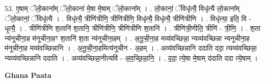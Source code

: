 \documentclass[17pt]{extarticle}
\begin{document}
53. ए॒षाम् ॅलो॒काना᳚म् ॅलो॒काना॑ मे॒षा मे॒षाम् ॅलो॒काना᳚म् । . लो॒कानां॒ ॅविधृ॑त्यै॒ विधृ॑त्यै लो॒काना᳚म् ॅलो॒कानां॒ ॅविधृ॑त्यै । . विधृ॑त्यै॒ त्रीणि॑त्रीणि॒ त्रीणि॑त्रीणि॒ विधृ॑त्यै॒ विधृ॑त्यै॒ त्रीणि॑त्रीणि । . विधृ॑त्या॒ इति॒ वि - धृ॒त्यै॒ । . त्रीणि॑त्रीणि श॒तानि॑ श॒तानि॒ त्रीणि॑त्रीणि॒ त्रीणि॑त्रीणि श॒तानि॑ । . त्रीणि॑त्री॒णीति॒ त्रीणि॑ - त्री॒णि॒ । . श॒ता न्य॑नूचीना॒ह म॑नूचीना॒हꣳ श॒तानि॑ श॒ता न्य॑नूचीना॒हम् । . अ॒नू॒ची॒ना॒ह मव्य॑वच्छिन्ना॒ न्यव्य॑वच्छिन्ना न्यनूचीना॒ह म॑नूचीना॒ह मव्य॑वच्छिन्नानि । . अ॒नू॒ची॒ना॒हमित्य॑नूचीन - अ॒हम् । . अव्य॑वच्छिन्नानि ददाति ददा॒ त्यव्य॑वच्छिन्ना॒ न्यव्य॑वच्छिन्नानि ददाति । . अव्य॑वच्छिन्ना॒नीत्यवि॑ - अ॒व॒च्छि॒न्ना॒नि॒ । . द॒दा॒ त्ये॒षा मे॒षाम् द॑दाति ददा त्ये॒षाम् । \newline

\textbf{Ghana Paata } \newline
\end{document}
